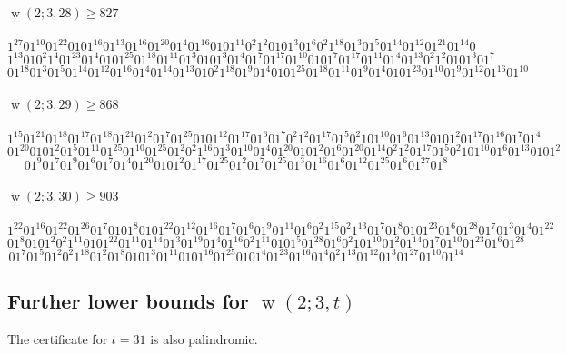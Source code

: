 \documentclass[final,3p,times]{elsarticle}
\theoremstyle{definition}
\DeclareMathOperator{\vdw}{w}
\begin{document}
\begin{appendix}
\paragraph{$\vdw(2; 3, 28)\geq 827$}
$$1^{27}01^{10}01^{22}0101^{16}01^{13}01^{16}01^{20}01^{4}01^{16}0101^{11}0^{2}1^{2}010
1^{3}01^{6}0^{2}1^{18}01^{3}01^{5}01^{14}01^{12}01^{21}01^{14}0$$
$$1^{13}010^{2}1^{4}01^{23}01^{4}0101^{25}01^{18}01^{11}01^{3}0101^{3}01^{4}01^{7}0
1^{17}01^{10}0101^{7}01^{17}01^{11}01^{4}01^{13}0^{2}1^{2}0101^{3}01^{7}$$
$$01^{18}01^{3}01^{5}01^{14}01^{12}01^{16}01^{4}01^{14}01^{13}010^{2}1^{18}01^{9}01^{4}010
1^{25}01^{18}01^{11}01^{9}01^{4}0101^{23}01^{10}01^{9}01^{12}01^{16}01^{10}$$

\paragraph{$\vdw(2; 3, 29)\geq 868$}
$$1^{15}01^{21}01^{18}01^{17}01^{18}01^{21}01^{2}01^{7}01^{25}0101^{12}01^{17}01^{6}01^{7}0^{2}
1^{2}01^{17}01^{5}0^{2}101^{10}01^{6}01^{13}0101^{2}01^{17}01^{16}01^{7}01^{4}$$
$$01^{20}0101^{2}01^{5}01^{11}01^{25}01^{10}01^{25}01^{2}0^{2}1^{16}0
1^{3}01^{10}01^{4}01^{20}0101^{2}01^{6}01^{20}01^{14}0^{2}1^{2}01^{17}01^{5}0^{2}101^{10}01^{6}01^{13}0101^{2}$$
$$01^{9}01^{7}01^{9}01^{6}01^{7}0
1^{4}01^{20}0101^{2}01^{17}01^{25}01^{2}01^{7}01^{25}01^{3}01^{16}01^{6}01^{12}01^{25}01^{6}01^{27}01^{8}$$


\paragraph{$\vdw(2; 3, 30) \geq 903$}

$$1^{22}01^{16}01^{22}01^{26}01^{7}0101^{8}0101^{22}01^{12}01^{16}01^{7}01^{6}01^{9}01^{11}01^{6}0^{2}1^{15}0^{2}1^{13}01^{7}01^{8}0101^{23}01^{6}01^{28}01^{7}01^{3}01^{4}01^{22}$$
$$01^{8}0101^{2}0^{2}1^{11}0101^{22}01^{11}01^{14}01^{3}01^{19}01^{4}01^{16}0^{2}1^{11}0101^{5}01^{28}01^{6}0^{2}101^{10}01^{2}01^{14}01^{7}01^{10}01^{23}01^{6}01^{28}$$
$$01^{7}01^{5}01^{2}0^{2}1^{18}01^{2}01^{8}0101^{3}01^{11}0101^{16}01^{25}0101^{4}01^{23}01^{16}01^{4}0^{2}1^{13}01^{12}01^{3}01^{27}01^{10}01^{14}$$

\normalsize


\subsection{Further lower bounds for $\vdw(2;3,t)$}
\label{sec:Certificates3tf}

The certificate for $t=31$ is also palindromic.


\end{appendix}
\end{document}
